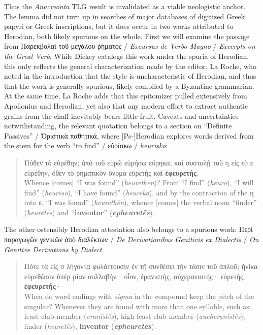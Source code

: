 Thus the \textit{Anacreonta} TLG result is invalidated as a viable neologistic anchor. %
\vfill{}
The lemma did not turn up in searches of major databases of digitized Greek papyri or Greek inscriptions, %
but it does occur in two works attributed to Herodian, both likely spurious on the whole. %
First we will examine the passage from Παρεκβολαὶ τοῦ μεγάλου ῥήματος / %
\textit{Excursus de Verbo Magno} / \textit{Excerpts on the Great Verb}. %
While Dickey catalogs this work under the spuria of Herodian, %
this only reflects the general characterization made by the editor, La Roche, %
who noted in the introduction that the style is uncharacteristic of Herodian, %
and thus that the work is generally spurious, likely compiled by a Byzantine grammarian. %
At the same time, La Roche adds that this epitomizer pulled extensively from Apollonius and Herodian, %
yet also that any modern effort to extract authentic grains from the chaff inevitably bears little fruit. %
\vfill{}
Caveats and uncertainties notwithstanding, %
the relevant quotation belongs to a section on “Definite Passives” / Ὁριστικὰ παθητικά, %
where [Ps-]Herodian explores words derived from the stem for the verb “to find” / εὑρίσκω / \textit{heuriskō}: %

\clearpage
 \begin{quote}Πόθεν τὸ εὑρέθην; ἀπὸ τοῦ εὑρῶ εὑρήσω εὕρηκα, %
 καὶ συστολῇ τοῦ η εἰς τὸ ε εὑρέθην, %
 ὅθεν τὸ ῥηματικὸν ὄνομα εὑρετὴς καὶ \textbf{ἐφευρετής}. \\[1mm] %
 Whence [comes] “I was found” (\textit{heurethēn})? %
 From “I find” (\textit{heurō}), “I will find” (\textit{heurēsō}), “I have found” (\textit{heurēka}), %
 and by the contraction of the η into ε, “I was found” (\textit{heurethēn}), %
 whence [comes] the verbal noun “finder” (\textit{heuretēs}) and “\textbf{inventor}” (\textit{\textbf{epheuretēs}}). \end{quote} %
 \vspace*{3mm}

The other ostensibly Herodian attestation also belongs to a spurious work: %
Περὶ παραγωγῶν γενικῶν ἀπὸ διαλέκτων / \textit{De Derivationibus Genitivis ex Dialectis} / %
\textit{On Genitive Derivations by Dialect}. %

\vspace*{3mm} 
 \begin{quote}Πότε τὰ εἰς σ λήγοντα φυλάττουσιν ἐν τῇ συνθέσει τὴν τάσιν τοῦ ἁπλοῦ; %
 ἡνίκα εὑρεθῶσιν ὑπὲρ μίαν συλλαβήν· %
 οἷον, ἐρανιστὴς, αὐχερανιστής· %
 εὑρετὴς, \textbf{ἐφευρετής}· \\[1mm] %
 When do word endings with \textit{sigma} in the compound keep %
 the pitch of the singular? %
 Whenever they are found with more than one syllable, %
 such as: feast-club-member (\textit{eranistēs}), high-feast-club-member (\textit{aucheranistēs}); %
 finder (\textit{heuretēs}), \textbf{inventor} (\textit{\textbf{epheuretēs}}). \end{quote} %
 \vspace*{3mm}

